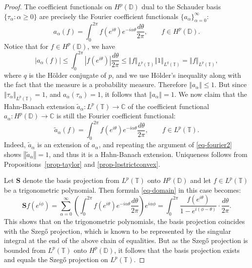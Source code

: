 \documentclass[letterpaper,11pt,reqno]{amsart}
\theoremstyle{plain}
\theoremstyle{definition}
\theoremstyle{remark}
\theoremstyle{remark}
\numberwithin{equation}{section}
\newcommand{\abs}[1]{\left\vert#1\right\vert}
\newcommand{\norm}[1]{\left\Vert#1\right\Vert}
\newcommand{\wt}{\widetilde}
\newcommand{\cx}{{\mathbb C}}
\newcommand{\D}{{\mathbb D}}
\newcommand{\T}{{\mathbb T}}
\begin{document}
\begin{proof}
The coefficient functionals on $H^p(\D)$ dual to the Schauder basis $\{\tau_\alpha: \alpha\geq 0\}$ are precisely the Fourier coefficient functionals $\{a_\alpha\}_{\alpha=0}^\infty$:
\begin{equation}\label{eq-fourier}
a_\alpha(f)= \int_{0}^{2\pi} f(e^{i\theta})e^{-i\alpha \theta}\frac{d\theta}{2\pi}, \qquad f\in H^p(\D).
\end{equation}
Notice that for $f\in H^p(\D)$, we have
\begin{equation}
    \label{eq-fourier2}
    \abs{a_\alpha(f)} \leq \int_{0}^{2\pi} \abs{f(e^{i\theta})}\frac{d\theta}{2\pi} \leq \norm{f}_{L^p(\T)}\norm{1}_{L^q(\T)} = \norm{f}_{L^p(\T)}, 
\end{equation}
where $q$ is the Hölder conjugate of $p$, and we use Hölder's inequality along with the fact that the measure is a probability measure. 
Therefore $\norm{a_\alpha} \leq 1$. But since $\norm{\tau_\alpha}_{L^p(\T)}=1$, and $a_\alpha(\tau_\alpha)=1$, it follows that $\norm{a_\alpha}=1$. 
We now claim that the Hahn-Banach extension $\wt{a}_\alpha:L^p(\T)\to \cx$ of the coefficient functional $a_\alpha:H^p(\D)\to \cx$ is still the Fourier coefficient functional:
\[ 
\wt{a}_\alpha(f)= \int_{0}^{2\pi} f(e^{i\theta})e^{-i\alpha \theta}\frac{d\theta}{2\pi}, \qquad f\in L^p(\T).
\]
Indeed, $\wt{a}_\alpha$ is an extension of $a_\alpha$, and repeating the argument of \eqref{eq-fourier2} shows $\norm{\wt{a}_\alpha}=1$, and thus it is a Hahn-Banach extension. 
Uniqueness follows from Propositions~\ref{prop-taylor} and \ref{prop-lpstrictconvex}. 

Let $\bm{S}$ denote the basis projection from $L^p(\T)$ onto $H^p(\D)$ and let $f\in L^p(\T)$ be a trigonometric polynomial. 
Then formula \eqref{eq-domain} in this case becomes:
\[
\bm{S}f(e^{i\phi}) = \sum_{\alpha=0}^\infty \left(\int_0^{2\pi} f(e^{i\theta})e^{-i\alpha \theta}\frac{d\theta}{2\pi}\right) e^{i\alpha\phi} = \int_0^{2\pi}\frac{f(e^{i\theta})}{1- e^{i(\phi-\theta)}}\cdot\frac{d\theta}{2\pi}.
\]
This shows that on the trigonometric polynomials, the basis projection coincides with the Szeg\H{o} projection, which is known to be represented by the singular integral at the end of the above chain of equalities. 
But as the Szeg\H{o} projection is bounded from $L^p(\T)$ onto $H^p(\D)$, it follows that the basis projection exists and equals the Szeg\H{o} projection on $L^p(\T)$.
\end{proof}
\end{document}
